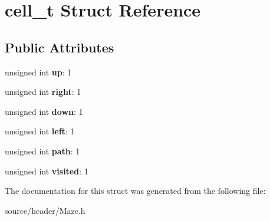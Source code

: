 \hypertarget{structcell__t}{
\section{cell\_\-t Struct Reference}
\label{d9/d8a/structcell__t}
}
\subsection*{Public Attributes}
\begin{DoxyCompactItemize}
\item 
\hypertarget{structcell__t_aca4a99c0cb9afa972a7d0b21211a03ab}{
unsigned int {\bfseries up}: 1}
\label{d9/d8a/structcell__t_aca4a99c0cb9afa972a7d0b21211a03ab}

\item 
\hypertarget{structcell__t_a4316cad340f54a20c1551742054ce38f}{
unsigned int {\bfseries right}: 1}
\label{d9/d8a/structcell__t_a4316cad340f54a20c1551742054ce38f}

\item 
\hypertarget{structcell__t_a3e0b733a05da0b1181e4a433670f8a81}{
unsigned int {\bfseries down}: 1}
\label{d9/d8a/structcell__t_a3e0b733a05da0b1181e4a433670f8a81}

\item 
\hypertarget{structcell__t_adce82b9aef49dbafa817eabc4541769c}{
unsigned int {\bfseries left}: 1}
\label{d9/d8a/structcell__t_adce82b9aef49dbafa817eabc4541769c}

\item 
\hypertarget{structcell__t_a87ea82717113f9ea45077a11fbb3f5c5}{
unsigned int {\bfseries path}: 1}
\label{d9/d8a/structcell__t_a87ea82717113f9ea45077a11fbb3f5c5}

\item 
\hypertarget{structcell__t_a4efaf27751f0ecc83a49c3cb1a17e1f1}{
unsigned int {\bfseries visited}: 1}
\label{d9/d8a/structcell__t_a4efaf27751f0ecc83a49c3cb1a17e1f1}

\end{DoxyCompactItemize}


The documentation for this struct was generated from the following file:\begin{DoxyCompactItemize}
\item 
source/header/Maze.h\end{DoxyCompactItemize}
